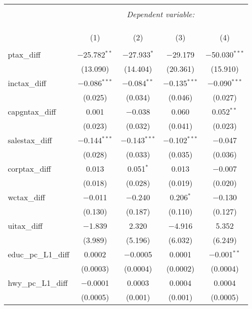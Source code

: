 
\begin{table}[!htbp] \centering 
  \caption{} 
  \label{} 
\begin{tabular}{@{\extracolsep{5pt}}lcccc} 
\\[-1.8ex]\hline 
\hline \\[-1.8ex] 
 & \multicolumn{4}{c}{\textit{Dependent variable:}} \\ 
\cline{2-5} 
\\[-1.8ex] & \multicolumn{4}{c}{ } \\ 
\\[-1.8ex] & (1) & (2) & (3) & (4)\\ 
\hline \\[-1.8ex] 
 ptax\_diff & $-$25.782$^{**}$ & $-$27.933$^{*}$ & $-$29.179 & $-$50.030$^{***}$ \\ 
  & (13.090) & (14.404) & (20.361) & (15.910) \\ 
  inctax\_diff & $-$0.086$^{***}$ & $-$0.084$^{**}$ & $-$0.135$^{***}$ & $-$0.090$^{***}$ \\ 
  & (0.025) & (0.034) & (0.046) & (0.027) \\ 
  capgntax\_diff & 0.001 & $-$0.038 & 0.060 & 0.052$^{**}$ \\ 
  & (0.023) & (0.032) & (0.041) & (0.023) \\ 
  salestax\_diff & $-$0.144$^{***}$ & $-$0.143$^{***}$ & $-$0.102$^{***}$ & $-$0.047 \\ 
  & (0.028) & (0.033) & (0.035) & (0.036) \\ 
  corptax\_diff & 0.013 & 0.051$^{*}$ & 0.013 & $-$0.007 \\ 
  & (0.018) & (0.028) & (0.019) & (0.020) \\ 
  wctax\_diff & $-$0.011 & $-$0.240 & 0.206$^{*}$ & $-$0.130 \\ 
  & (0.130) & (0.187) & (0.110) & (0.127) \\ 
  uitax\_diff & $-$1.839 & 2.320 & $-$4.916 & 5.352 \\ 
  & (3.989) & (5.196) & (6.032) & (6.249) \\ 
  educ\_pc\_L1\_diff & 0.0002 & $-$0.0005 & 0.0001 & $-$0.001$^{**}$ \\ 
  & (0.0003) & (0.0004) & (0.0002) & (0.0004) \\ 
  hwy\_pc\_L1\_diff & $-$0.0001 & 0.0003 & 0.0004 & 0.0004 \\ 
  & (0.0005) & (0.001) & (0.001) & (0.0005) \\ 

\end{tabular}
\end{table}
